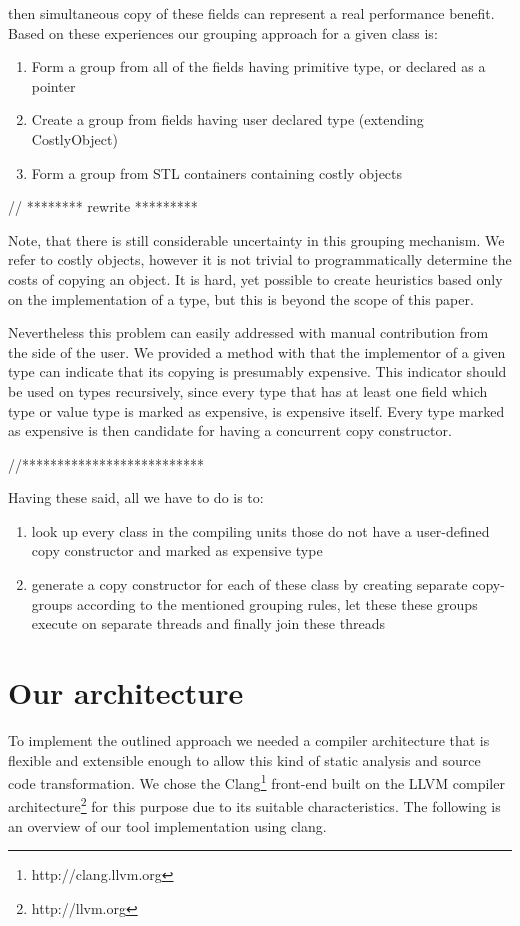 \documentclass{article}
\begin{document}
then simultaneous copy of these fields can represent a real performance benefit. Based on these experiences our grouping approach for a given class is:
\begin{enumerate}
 \item Form a group from all of the fields having primitive type, or declared as a pointer
 \item Create a group from fields having user declared type (extending CostlyObject)
 \item Form a group from STL containers containing costly objects
\end{enumerate}

// ******** rewrite *********

Note, that there is still considerable uncertainty in this grouping mechanism. We refer to costly objects, however it is not trivial to programmatically determine the costs of copying an object. It is hard, yet possible to create heuristics based only on the implementation of a type, but this is beyond the scope of this paper.

Nevertheless this problem can easily addressed with manual contribution from the side of the user. We provided a method with that the implementor of a given type can indicate that its copying is presumably expensive. This indicator should be used on types recursively, since every type that has at least one field which type or value type is marked as expensive, is expensive itself. Every type marked as expensive is then candidate for having a concurrent copy constructor. 

//**************************

Having these said, all we have to do is to:
\begin{enumerate}
 \item look up every class in the compiling units those do not have a user-defined copy constructor and marked as expensive type
 \item generate a copy constructor for each of these class by creating separate copy-groups according to the mentioned grouping rules, let these these groups execute on separate threads and finally join these threads
\end{enumerate}

\section{Our architecture}
To implement the outlined approach we needed a compiler architecture that is flexible and extensible enough to allow this kind of static analysis and source code transformation. We chose the Clang\footnote{http://clang.llvm.org} front-end built on the LLVM compiler architecture\footnote{http://llvm.org} for this purpose due to its suitable characteristics. The following is an overview of our tool implementation using clang.
\end{document}
